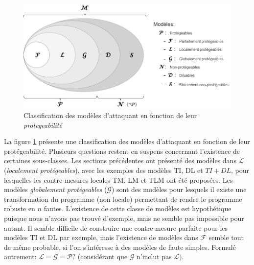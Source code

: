         \begin{figure}[!h]\centering
            \includegraphics[scale=0.4]{ch5-placement/img/protectable-models-set-extended.drawio.png}
            \caption{Classification des modèles d'attaquant en fonction de leur \textit{protegeabilité}}
            \label{fig:models-protectability}
        \end{figure}
        
        La figure \ref{fig:models-protectability} présente une classification des modèles d'attaquant en fonction de leur protégeabilité. 
        Plusieurs questions restent en suspens concernant l'existence de certaines sous-classes.
        Les sections précédentes ont présenté des modèles dans $\mathcal{L}$ (\textit{localement protégeables}), avec les exemples des modèles \gls{TI}, \gls{DL} et $TI+DL$, pour lesquelles les contre-mesures locales \gls{TM}, \gls{LM} et \gls{TLM} ont été proposées.
        Les modèles \textit{globalement protégeables} ($\mathcal{G}$) sont des modèles pour lesquels il existe une transformation du programme (non locale) permettant de rendre le programme robuste en $n$ fautes. L'existence de cette classe de modèles est hypothétique puisque nous n'avons pas trouvé d'exemple, mais ne semble pas impossible pour autant.
        Il semble difficile de construire une contre-mesure parfaite pour les modèles \gls{TI} et \gls{DL} par exemple, mais l'existence de modèles dans $\mathcal{F}$ semble tout de même probable, si l'on s'intéresse à des modèles de faute simples.
        Formulé autrement: $\mathcal{L} = \mathcal{G} = \mathcal{P} ?$ (considérant que $\mathcal{G}$ n'inclut pas $\mathcal{L})$.
        
